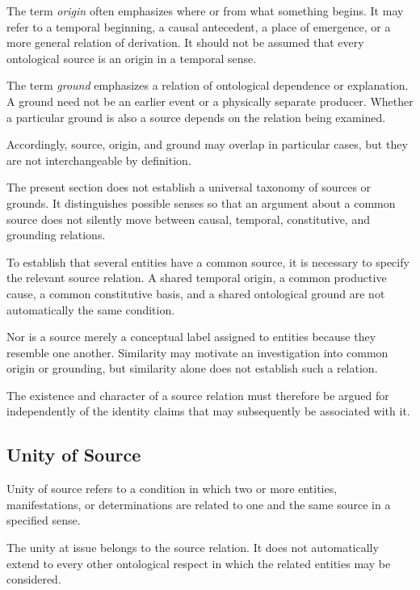 The term \emph{origin} often emphasizes where or
from what something begins. It may refer to a
temporal beginning, a causal antecedent, a place
of emergence, or a more general relation of
derivation. It should not be assumed that every
ontological source is an origin in a temporal sense.

The term \emph{ground} emphasizes a relation of
ontological dependence or explanation. A ground
need not be an earlier event or a physically
separate producer. Whether a particular ground
is also a source depends on the relation being
examined.

Accordingly, source, origin, and ground may overlap
in particular cases, but they are not interchangeable
by definition.

The present section does not establish a universal
taxonomy of sources or grounds. It distinguishes
possible senses so that an argument about a common
source does not silently move between causal,
temporal, constitutive, and grounding relations.

To establish that several entities have a common
source, it is necessary to specify the relevant
source relation. A shared temporal origin, a common
productive cause, a common constitutive basis,
and a shared ontological ground are not automatically
the same condition.

Nor is a source merely a conceptual label assigned
to entities because they resemble one another.
Similarity may motivate an investigation into
common origin or grounding, but similarity alone
does not establish such a relation.

The existence and character of a source relation
must therefore be argued for independently of
the identity claims that may subsequently be
associated with it.


\subsection{Unity of Source}

Unity of source refers to a condition in which
two or more entities, manifestations, or
determinations are related to one and the same
source in a specified sense.

The unity at issue belongs to the source relation.
It does not automatically extend to every other
ontological respect in which the related entities
may be considered.

